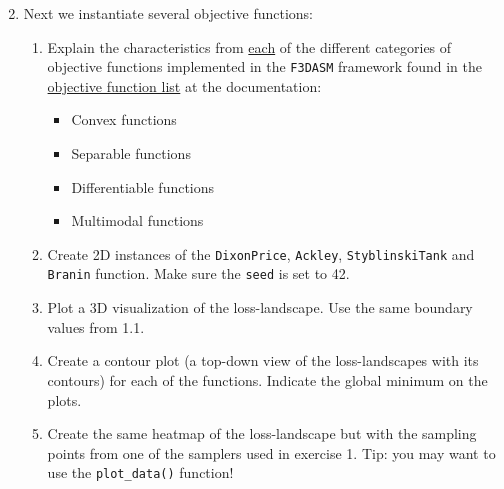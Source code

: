 \documentclass[10pt,a4paper,twoside]{article} %
\def\code#1{\texttt{#1}}
\begin{document}
\begin{enumerate}
	\setcounter{enumi}{1}
	\item Next we instantiate several objective functions:
	\begin{enumerate} [label*=\arabic*.]


		\item Explain the characteristics from \underline{each} of the different categories of objective functions implemented in the \code{F3DASM} framework found in the  \href{https://bessagroup.github.io/F3DASM/capabilities/functions.html\#implemented-benchmark-functions}{objective function list} at the documentation:
		\begin{itemize}
			\item Convex functions
			\item Separable functions
			\item Differentiable functions
			\item Multimodal functions
		\end{itemize}
	
	    \item Create 2D instances of the \code{DixonPrice}, \code{Ackley}, \code{StyblinskiTank} and \code{Branin} function. Make sure the \code{seed} is set to 42.
	

	
	
		\item Plot a 3D visualization of the loss-landscape. Use the same boundary values from 1.1.
		\item Create a contour plot (a top-down view of the loss-landscapes with its contours) for each of the functions. Indicate the global minimum on the plots.
		\item Create the same heatmap of the loss-landscape but with the sampling points from one of the samplers used in exercise 1. Tip: you may want to use the \code{plot\_data()} function!
	
	\end{enumerate}
\end{enumerate}
\end{document}
